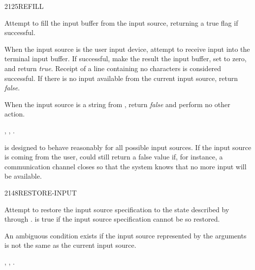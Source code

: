 %
%
%


\vspace*{-3ex}
\begin{worddef}{2125}{REFILL}
\item {}

	Attempt to fill the input buffer from the input source,
	returning a true flag if successful.

	When the input source is the user input device, attempt to
	receive input into the terminal input buffer. If successful,
	make the result the input buffer, set  to zero, and
	return \emph{true}. Receipt of a line containing no characters
	is considered successful. If there is no input available from
	the current input source, return \emph{false}.

	When the input source is a string from , return
	\emph{false} and perform no other action.

\see {},
	,
	.

	\begin{rationale} %
		 is designed to behave reasonably for all possible
		input sources. If the input source is coming from the user,
		 could still return a false value if, for instance,
		a communication channel closes so that the system knows that no
		more input will be available.
	\end{rationale}
\end{worddef}

\vspace*{-3ex}
\enlargethispage{8ex}
\begin{worddef}{2148}{RESTORE-INPUT}
\item {}

	Attempt to restore the input source specification to the state
	described by  through .  is
	true if the input source specification cannot be so restored.

	An ambiguous condition exists if the input source represented
	by the arguments is not the same as the current input source.

\see {}, ,
	  .
\end{worddef}

